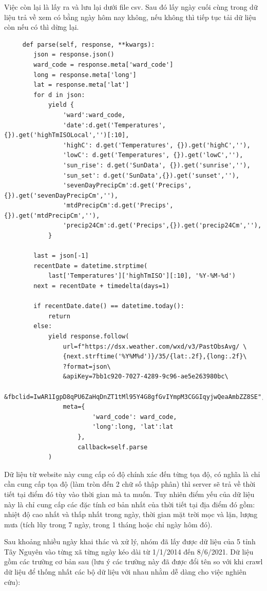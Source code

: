 \documentclass{article}
\begin{document}
Việc còn lại là lấy ra và lưu lại dưới file csv. Sau đó lấy ngày cuối cùng trong dữ liệu trả về xem có bằng ngày hôm nay không, nếu không thì tiếp tục tải dữ liệu còn nếu có thì dừng lại.

\begin{verbatim}
	 def parse(self, response, **kwargs):
        json = response.json()
        ward_code = response.meta['ward_code']
        long = response.meta['long']
        lat = response.meta['lat']
        for d in json:
            yield {
                'ward':ward_code,
                'date':d.get('Temperatures', {}).get('highTmISOLocal','')[:10],
                'highC': d.get('Temperatures', {}).get('highC',''),
                'lowC': d.get('Temperatures', {}).get('lowC',''),
                'sun_rise': d.get('SunData', {}).get('sunrise',''),
                'sun_set': d.get('SunData',{}).get('sunset',''),
                'sevenDayPrecipCm':d.get('Precips',{}).get('sevenDayPrecipCm',''),
                'mtdPrecipCm':d.get('Precips',{}).get('mtdPrecipCm',''),
                'precip24Cm':d.get('Precips',{}).get('precip24Cm',''),
            }

		last = json[-1]
        recentDate = datetime.strptime(
            last['Temperatures']['highTmISO'][:10], '%Y-%M-%d')
        next = recentDate + timedelta(days=1)
		
		if recentDate.date() == datetime.today():
        	return
        else:
            yield response.follow(
                url=f"https://dsx.weather.com/wxd/v3/PastObsAvg/ \
				{next.strftime('%Y%M%d')}/35/{lat:.2f},{long:.2f}\
				?format=json\
				&apiKey=7bb1c920-7027-4289-9c96-ae5e263980bc\
				&fbclid=IwAR1IgpD8qPU6ZaHqDnZT1tMl95Y4G8gfGvIYmpM3CGGIqyjwQeaAmbZZ8SE",
                meta={
                        'ward_code': ward_code,
                        'long':long, 'lat':lat
                    },
                    callback=self.parse
            )
\end{verbatim}

Dữ liệu từ website này cung cấp có độ chính xác đến từng tọa độ, có nghĩa là chỉ cần cung cấp tọa độ (làm tròn đến 2 chữ số thập phân) thì server sẽ trả về thời tiết tại điểm đó tùy vào thời gian mà ta muốn. Tuy nhiên điểm yếu của dữ liệu này là chỉ cung cấp các đặc tính cơ bản nhất của thời tiết tại địa điểm đó gồm: nhiệt độ cao nhất và thấp nhất trong ngày, thời gian mặt trời mọc và lặn, lượng mưa (tích lũy trong 7 ngày, trong 1 tháng hoặc chỉ ngày hôm đó).

Sau khoảng nhiều ngày khai thác và xử lý, nhóm đã lấy được dữ liệu của 5 tỉnh Tây Nguyên vào từng xã từng ngày kéo dài từ 1/1/2014 đến 8/6/2021. Dữ liệu gồm các trường cơ bản sau (lưu ý các trường này đã được đổi tên so với khi crawl dữ liệu để thống nhất các bộ dữ liệu với nhau nhằm dễ dàng cho việc nghiên cứu):
\end{document}
